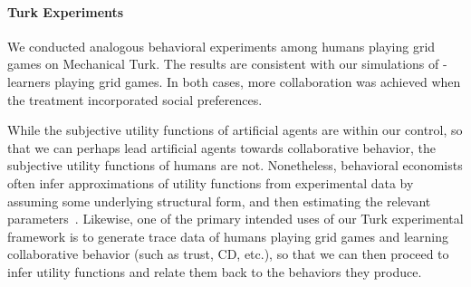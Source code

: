 
\vspace{\up}
\paragraph{Turk Experiments}
\label{sec:human}

We conducted analogous behavioral experiments among humans playing
grid games on Mechanical Turk.
%
%
The results are consistent with our simulations of \Q-learners playing
grid games.  In both cases, more collaboration was achieved when the
treatment incorporated social preferences.

While the subjective utility functions of artificial agents are within
our control, so that we can perhaps lead artificial agents towards
collaborative behavior, the subjective utility functions of humans are
not.  Nonetheless, behavioral economists often infer approximations of
utility functions from experimental data by assuming some underlying
structural form, and then estimating the relevant
parameters~\cite{blanco11,fisman07}.
Likewise, one of the primary intended uses of our Turk experimental
framework is to generate trace data of humans playing grid games and
learning collaborative behavior (such as trust, CD, etc.), so that we
can then proceed to infer utility functions and relate them back to
the behaviors they produce.

